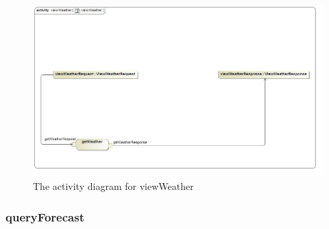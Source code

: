 \begin{figure}[H]
	\centering
	\includegraphics[width=1.0\textwidth]{../images/funcReq/viewWeatherActivityDiagram.jpg}
	\caption{The activity diagram for viewWeather \label{overflow}}
\end{figure}

\subsubsection{queryForecast}